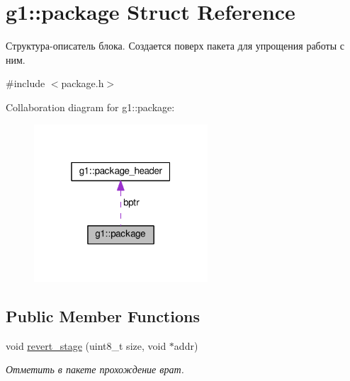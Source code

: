 \hypertarget{structg1_1_1package}{}\section{g1\+:\+:package Struct Reference}
\label{structg1_1_1package}


Структура-\/описатель блока. Создается поверх пакета для упрощения работы с ним.  




{\ttfamily \#include $<$package.\+h$>$}



Collaboration diagram for g1\+:\+:package\+:\nopagebreak
\begin{figure}[H]
\begin{center}
\leavevmode
\includegraphics[width=184pt]{structg1_1_1package__coll__graph}
\end{center}
\end{figure}
\subsection*{Public Member Functions}
\begin{DoxyCompactItemize}
\item 
void \hyperlink{structg1_1_1package_a667ed03d442d2c9cfe28917c75525e4e}{revert\+\_\+stage} (uint8\+\_\+t size, void $\ast$addr)\hypertarget{structg1_1_1package_a667ed03d442d2c9cfe28917c75525e4e}{}\label{structg1_1_1package_a667ed03d442d2c9cfe28917c75525e4e}

\begin{DoxyCompactList}\small\item\em Отметить в пакете прохождение врат. \end{DoxyCompactList}\end{DoxyCompactItemize}
